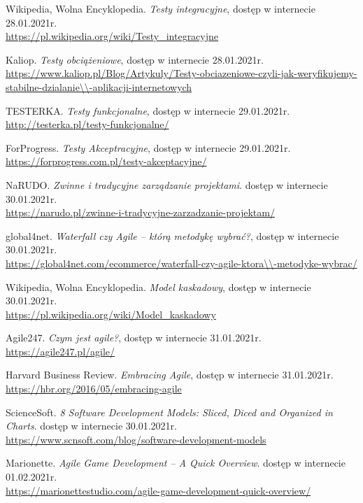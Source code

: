 \documentclass[oneside,polski,logo]{amuthesis}
\begin{document}
\begin{thebibliography}{100}
Wikipedia, Wolna Encyklopedia. \emph{Testy integracyjne}, dostęp w internecie 28.01.2021r.\\
\url{https://pl.wikipedia.org/wiki/Testy\_integracyjne}

Kaliop. \emph{Testy obciążeniowe}, dostęp w internecie 28.01.2021r.\\
\url{https://www.kaliop.pl/Blog/Artykuly/Testy-obciazeniowe-czyli-jak-weryfikujemy-stabilne-dzialanie\\-aplikacji-internetowych}

TESTERKA. \emph{Testy funkcjonalne}, dostęp w internecie 29.01.2021r.\\
\url{http://testerka.pl/testy-funkcjonalne/}

ForProgress. \emph{Testy Akceptracyjne}, dostęp w internecie 29.01.2021r.\\
\url{https://forprogress.com.pl/testy-akceptacyjne/}

NaRUDO. \emph{Zwinne i tradycyjne zarządzanie projektami}. dostęp w internecie 30.01.2021r.\\
\url{https://narudo.pl/zwinne-i-tradycyjne-zarzadzanie-projektam/}

global4net. \emph{Waterfall czy Agile – którą metodykę wybrać?}, dostęp w internecie 30.01.2021r.\\
 \url{https://global4net.com/ecommerce/waterfall-czy-agile-ktora\\-metodyke-wybrac/}

Wikipedia, Wolna Encyklopedia. \emph{Model kaskadowy}, dostęp w internecie 30.01.2021r.\\
\url{https://pl.wikipedia.org/wiki/Model\_kaskadowy}

Agile247. \emph{Czym jest agile?}, dostęp w internecie 31.01.2021r.\\
\url{https://agile247.pl/agile/}

Harvard Business Review. \emph{Embracing Agile}, dostęp w internecie 31.01.2021r.\\
\url{https://hbr.org/2016/05/embracing-agile}

ScienceSoft. \emph{8 Software Development Models: Sliced, Diced and Organized in Charts}.  dostęp w internecie 30.01.2021r.\\
\url{https://www.scnsoft.com/blog/software-development-models}

Marionette. \emph{Agile Game Development – A Quick Overview}. dostęp w internecie 01.02.2021r.\\
\url{https://marionettestudio.com/agile-game-development-quick-overview/}


\end{thebibliography}
\end{document}
